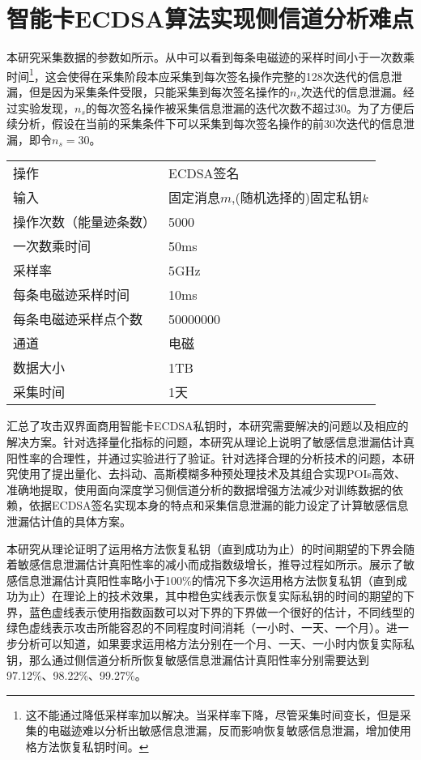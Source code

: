 {	\section{智能卡ECDSA算法实现侧信道分析难点}\label{sec:hardpoint}
	本研究采集数据的参数如所示。从中可以看到每条电磁迹的采样时间小于一次数乘时间\footnote{这不能通过降低采样率加以解决。当采样率下降，尽管采集时间变长，但是采集的电磁迹难以分析出敏感信息泄漏，反而影响恢复敏感信息泄漏，增加使用格方法恢复私钥时间。}，这会使得在采集阶段本应采集到每次签名操作完整的128次迭代的信息泄漏，但是因为采集条件受限，只能采集到每次签名操作的$n_s$次迭代的信息泄漏。经过实验发现，$n_s$的每次签名操作被采集信息泄漏的迭代次数不超过30。为了方便后续分析，假设在当前的采集条件下可以采集到每次签名操作的前30次迭代的信息泄漏，即令$n_s=30$。
	
	\begin{table}[!h]
		\label{tab:acquisitionpara}
		\centering
		\begin{tabular}{ll}
			\hline
			操作 & ECDSA签名\\
			输入 & 固定消息$m$,(随机选择的)固定私钥$k$\\
			操作次数（能量迹条数） & 5000\\
			一次数乘时间 & 50ms\\
			采样率 & 5GHz\\
			每条电磁迹采样时间 & 10ms\\
			每条电磁迹采样点个数 & 50000000\\
			通道 & 电磁\\
			数据大小 & 1TB\\
			采集时间 & 1天\\
			\hline
		\end{tabular}
	\end{table}

	汇总了攻击双界面商用智能卡ECDSA私钥时，本研究需要解决的问题以及相应的解决方案。针对选择量化指标的问题，本研究从理论上说明了敏感信息泄漏估计真阳性率的合理性，并通过实验进行了验证。针对选择合理的分析技术的问题，本研究使用了提出量化、去抖动、高斯模糊多种预处理技术及其组合实现POIs高效、准确地提取，使用面向深度学习侧信道分析的数据增强方法减少对训练数据的依赖，依据ECDSA签名实现本身的特点和采集信息泄漏的能力设定了计算敏感信息泄漏估计值的具体方案。
	
	本研究从理论证明了运用格方法恢复私钥（直到成功为止）的时间期望的下界会随着敏感信息泄漏估计真阳性率的减小而成指数级增长，推导过程如所示。展示了敏感信息泄漏估计真阳性率略小于100\%的情况下多次运用格方法恢复私钥（直到成功为止）在理论上的技术效果，其中橙色实线表示恢复实际私钥的时间的期望的下界，蓝色虚线表示使用指数函数可以对下界的下界做一个很好的估计，不同线型的绿色虚线表示攻击所能容忍的不同程度时间消耗（一小时、一天、一个月）。进一步分析可以知道，如果要求运用格方法分别在一个月、一天、一小时内恢复实际私钥，那么通过侧信道分析所恢复敏感信息泄漏估计真阳性率分别需要达到97.12\%、98.22\%、99.27\%。
	
}
